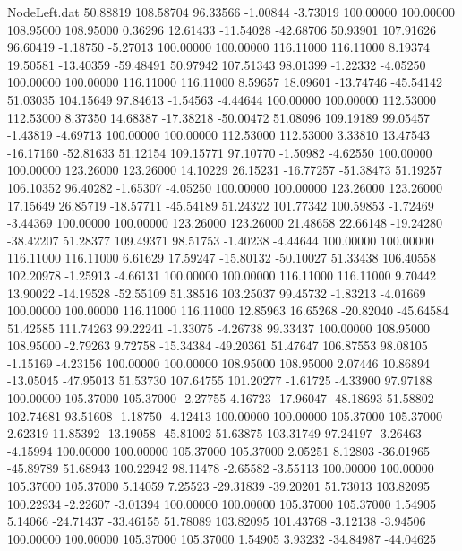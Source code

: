 \begin{filecontents}{NodeLeft.dat}
  50.88819  108.58704   96.33566    -1.00844   -3.73019  100.00000  100.00000  108.95000  108.95000    0.36296   12.61433  -11.54028  -42.68706
  50.93901  107.91626   96.60419    -1.18750   -5.27013  100.00000  100.00000  116.11000  116.11000    8.19374   19.50581  -13.40359  -59.48491
  50.97942  107.51343   98.01399    -1.22332   -4.05250  100.00000  100.00000  116.11000  116.11000    8.59657   18.09601  -13.74746  -45.54142
  51.03035  104.15649   97.84613    -1.54563   -4.44644  100.00000  100.00000  112.53000  112.53000    8.37350   14.68387  -17.38218  -50.00472
  51.08096  109.19189   99.05457    -1.43819   -4.69713  100.00000  100.00000  112.53000  112.53000    3.33810   13.47543  -16.17160  -52.81633
  51.12154  109.15771   97.10770    -1.50982   -4.62550  100.00000  100.00000  123.26000  123.26000   14.10229   26.15231  -16.77257  -51.38473
  51.19257  106.10352   96.40282    -1.65307   -4.05250  100.00000  100.00000  123.26000  123.26000   17.15649   26.85719  -18.57711  -45.54189
  51.24322  101.77342  100.59853    -1.72469   -3.44369  100.00000  100.00000  123.26000  123.26000   21.48658   22.66148  -19.24280  -38.42207
  51.28377  109.49371   98.51753    -1.40238   -4.44644  100.00000  100.00000  116.11000  116.11000    6.61629   17.59247  -15.80132  -50.10027
  51.33438  106.40558  102.20978    -1.25913   -4.66131  100.00000  100.00000  116.11000  116.11000    9.70442   13.90022  -14.19528  -52.55109
  51.38516  103.25037   99.45732    -1.83213   -4.01669  100.00000  100.00000  116.11000  116.11000   12.85963   16.65268  -20.82040  -45.64584
  51.42585  111.74263   99.22241    -1.33075   -4.26738   99.33437  100.00000  108.95000  108.95000   -2.79263    9.72758  -15.34384  -49.20361
  51.47647  106.87553   98.08105    -1.15169   -4.23156  100.00000  100.00000  108.95000  108.95000    2.07446   10.86894  -13.05045  -47.95013
  51.53730  107.64755  101.20277    -1.61725   -4.33900   97.97188  100.00000  105.37000  105.37000   -2.27755    4.16723  -17.96047  -48.18693
  51.58802  102.74681   93.51608    -1.18750   -4.12413  100.00000  100.00000  105.37000  105.37000    2.62319   11.85392  -13.19058  -45.81002
  51.63875  103.31749   97.24197    -3.26463   -4.15994  100.00000  100.00000  105.37000  105.37000    2.05251    8.12803  -36.01965  -45.89789
  51.68943  100.22942   98.11478    -2.65582   -3.55113  100.00000  100.00000  105.37000  105.37000    5.14059    7.25523  -29.31839  -39.20201
  51.73013  103.82095  100.22934    -2.22607   -3.01394  100.00000  100.00000  105.37000  105.37000    1.54905    5.14066  -24.71437  -33.46155
  51.78089  103.82095  101.43768    -3.12138   -3.94506  100.00000  100.00000  105.37000  105.37000    1.54905    3.93232  -34.84987  -44.04625

\end{filecontents}
